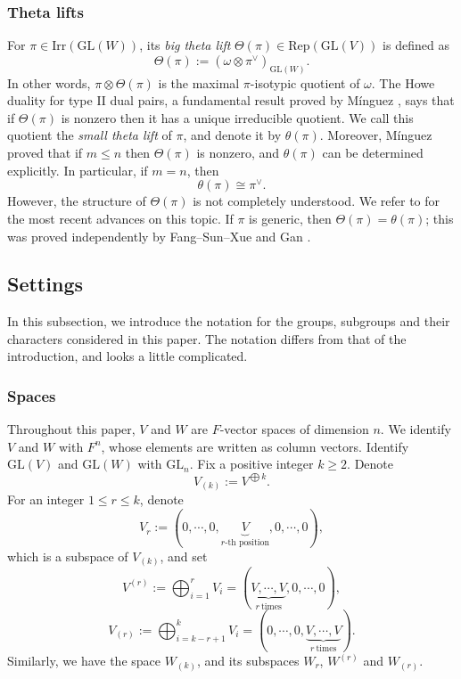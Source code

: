 \documentclass[11pt,reqno]{amsart}
\renewcommand{\1}{{\mathbf{1}}} \newcommand{\sB}{{\mathscr{B}}}
\newcommand{\GL}{{\mathrm{GL}}}\newcommand{\G}{{\mathrm{G}}}
\newcommand{\Irr}{{\mathrm{Irr}}} \newcommand{\cInd}{{\mathrm{c-Ind}}}
\newcommand{\Rep}{{\mathrm{Rep}}}\newcommand{\rec}{{\mathrm{rec}}} \newcommand{\rat}{{\mathrm{ra}}}
\theoremstyle{plain}
\theoremstyle{definition}
\numberwithin{equation}{section}
\begin{document}
\subsubsection{Theta lifts}  For $\pi\in\Irr(\GL(W))$,  its \emph{big theta lift}  $\Theta(\pi)\in\Rep(\GL(V))$ is defined as $$\Theta(\pi):=(\omega\otimes \pi^\vee)_{\GL(W)}.$$  In other words, $\pi\otimes\Theta(\pi)$ is the maximal $\pi$-isotypic quotient of $\omega$. The Howe duality for type II dual pairs, a fundamental result proved by M\'inguez \cite{min}, says that if $\Theta(\pi)$ is nonzero then it has a unique irreducible quotient. We call this quotient the \emph{small theta lift} of $\pi$, and denote it by $\theta(\pi)$. Moreover, M\'inguez \cite[Theorem 1]{min} proved that if $m\leq n$ then $\Theta(\pi)$ is nonzero, and $\theta(\pi)$ can be determined explicitly. In particular, if $m=n$, then $$\theta(\pi)\cong\pi^\vee.$$
 However, the structure of $\Theta(\pi)$ is not completely understood. We refer to \cite{chen}  for the most recent advances on this topic.
If $\pi$ is generic, then $\Theta(\pi)=\theta(\pi)$; this was proved independently by Fang--Sun--Xue \cite{fsx} and Gan \cite{gan19}.


\subsection{Settings} In this subsection, we introduce the notation for the groups, subgroups and their characters considered in this paper. The notation differs from that of the introduction, and looks a little complicated.


\subsubsection{Spaces}
Throughout this paper,  $V$ and $W$ are $F$-vector spaces of dimension $n$. We identify $V$ and $W$ with $F^n$, whose elements are written as column vectors. Identify $\GL(V)$ and $\GL(W)$ with $\GL_n$.
Fix a positive integer $k\geq2$. Denote $$V_{(k)}:=V^{\bigoplus k}.$$ For an integer $1\leq r\leq k$, denote $$V_r:=(0,\cdots,0,\underbrace{V}_{r\textrm{-th position}},0,\cdots,0),$$ which is a subspace of $V_{(k)}$, and  set
$$V^{(r)}:=\bigoplus_{i=1}^r V_i=(\underbrace{V,\cdots,V}_{r\ \textrm{times}},0,\cdots,0),$$
$$V_{(r)}:=\bigoplus_{i=k-r+1}^k V_i=(0,\cdots,0,\underbrace{V,\cdots,V}_{r\ \textrm{times}}).$$
Similarly,  we have the space $W_{(k)}$, and its subspaces $W_r$, $W^{(r)}$ and $W_{(r)}$.
\end{document}
